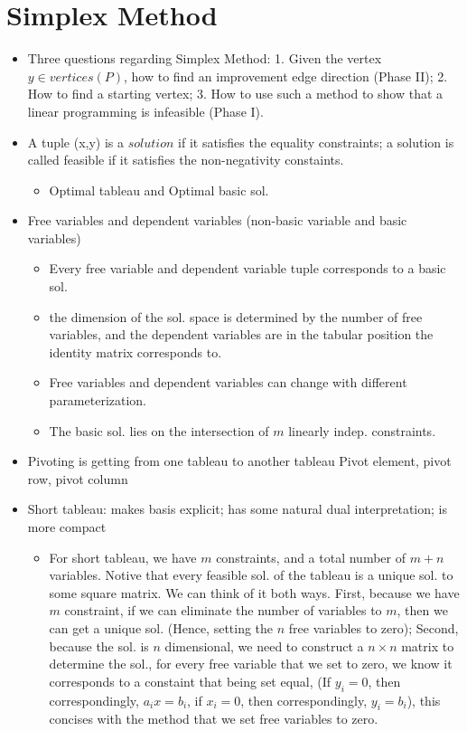 \documentclass{article}
\begin{document}
\section{Simplex Method}
\begin{itemize}
\item Three questions regarding Simplex Method: 1. Given the vertex $y\in vertices(P)$, how to find an improvement edge direction (Phase II); 2. How to find a starting vertex; 3. How to use such a method to show that a linear programming is infeasible (Phase I).
\item A tuple (x,y) is a $solution$ if it satisfies the equality constraints; a solution is called feasible if it satisfies the non-negativity constaints.
\begin{itemize}
\item Optimal tableau and Optimal basic sol.
\end{itemize}	
\item Free variables and dependent variables (non-basic variable and basic variables)
\begin{itemize}
\item Every free variable and dependent variable tuple corresponds to a basic sol.
\item the dimension of the sol. space is determined by the number of free variables, and the dependent variables are in the tabular position the identity matrix corresponds to. 
\item Free variables and dependent variables can change with different parameterization.
\item The basic sol. lies on the intersection of $m$ linearly indep. constraints.
\end{itemize}
\item Pivoting is getting from one tableau to another tableau Pivot element, pivot row, pivot column
\item Short tableau: makes basis explicit; has some natural dual interpretation; is more compact
\begin{itemize}
\item For short tableau, we have $m$ constraints, and a total number of $m+n$ variables. Notive that every feasible sol. of the tableau is a unique sol. to some square matrix. We can think of it both ways. First, because we have $m$ constraint, if we can eliminate the number of variables to $m$, then we can get a unique sol. (Hence, setting the $n$ free variables to zero); Second, because the sol. is $n$ dimensional, we need to construct a $n\times n$ matrix to determine the sol., for every free variable that we set to zero, we know it corresponds to a constaint that being set equal, (If $y_i=0$, then correspondingly, $a_ix=b_i$, if $x_i=0$, then correspondingly, $y_i=b_i$), this concises with the method that we set free variables to zero.

\end{itemize}
\end{itemize}
\end{document}
